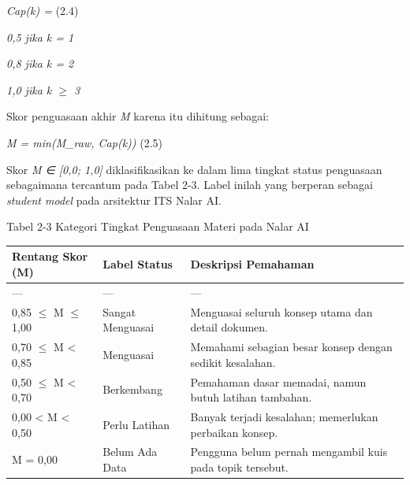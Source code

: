 \documentclass[12pt,a4paper]{article}
\begin{document}
\textit{Cap(k) =}	(2.4)



\textit{0,5   jika k = 1}



\textit{0,8   jika k = 2}



\textit{1,0   jika k $\ge$ 3}



Skor penguasaan akhir \textit{M} karena itu dihitung sebagai:



\textit{M = min(M\_raw, Cap(k))}	(2.5)



Skor \textit{M ∈ {[}0,0; 1,0{]}} diklasifikasikan ke dalam lima tingkat status penguasaan sebagaimana tercantum pada Tabel 2-3. Label inilah yang berperan sebagai \textit{student model} pada arsitektur ITS Nalar AI.



Tabel 2-3	Kategori Tingkat Penguasaan Materi pada Nalar AI



\begin{table}[h]

\centering

\begin{tabular}{lll}

\toprule

Rentang Skor (M) & Label Status & Deskripsi Pemahaman \\

\midrule

--- & --- & --- \\

0,85 $\le$ M $\le$ 1,00 & Sangat Menguasai & Menguasai seluruh konsep utama dan detail dokumen. \\

0,70 $\le$ M \textless{} 0,85 & Menguasai & Memahami sebagian besar konsep dengan sedikit kesalahan. \\

0,50 $\le$ M \textless{} 0,70 & Berkembang & Pemahaman dasar memadai, namun butuh latihan tambahan. \\

0,00 \textless{} M \textless{} 0,50 & Perlu Latihan & Banyak terjadi kesalahan; memerlukan perbaikan konsep. \\

M = 0,00 & Belum Ada Data & Pengguna belum pernah mengambil kuis pada topik tersebut. \\

\bottomrule

\end{tabular}

\end{table}
\end{document}
